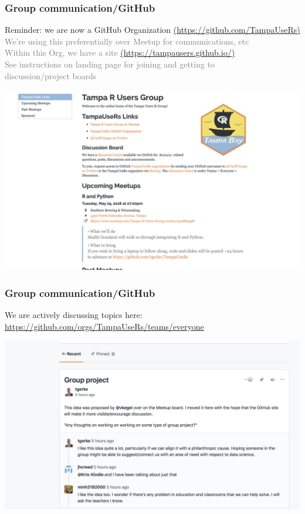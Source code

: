 \documentclass{beamer}
\newcommand{\si}[1]{\hspace{.5cm} \textcolor{gray} {#1}\\}
\newcommand{\sicont}[1]{\hspace{1cm} \textcolor{gray} {#1}\\}
\begin{document}
\small{


\begin{frame}[t]
\frametitle{Group communication/GitHub}
Reminder: we are now a GitHub Organization {\tiny\href{https://github.com/TampaUseRs}{(https://github.com/TampaUseRs)}}\\
\si{We're using this preferentially over Meetup for communications, etc}
\si{Within this Org, we have a site {\tiny\href{https://tampausers.github.io/}{(https://tampausers.github.io/)}}}
\si{See instructions on landing page for joining and getting to}
\sicont{discussion/project boards}
\begin{center}
\includegraphics[scale=.25, trim=0 0 0 0]{figures/webshot.png}
\end{center}
\end{frame}

\begin{frame}[t]
\frametitle{Group communication/GitHub}
We are actively discussing topics here:\\
\si{{\tiny\href{https://github.com/orgs/TampaUseRs/teams/everyone}{https://github.com/orgs/TampaUseRs/teams/everyone}}}
\begin{center}
\includegraphics[scale=.25, trim=0 0 0 0]{figures/teampage.png}
\end{center}
\end{frame}

}
\end{document}
